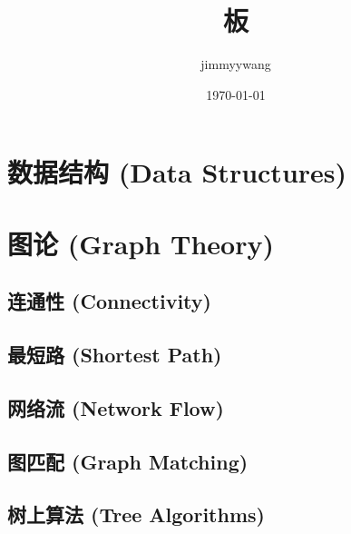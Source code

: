 \documentclass[a4paper]{article}
\title{板}
\author{jimmyywang}
\date{\today}
\begin{document}
\maketitle
\tableofcontents
\newpage

\section{数据结构 (Data Structures)}







\section{图论 (Graph Theory)}

\subsection{连通性 (Connectivity)}





\subsection{最短路 (Shortest Path)}



\subsection{网络流 (Network Flow)}




\subsection{图匹配 (Graph Matching)}


\subsection{树上算法 (Tree Algorithms)}
\end{document}
